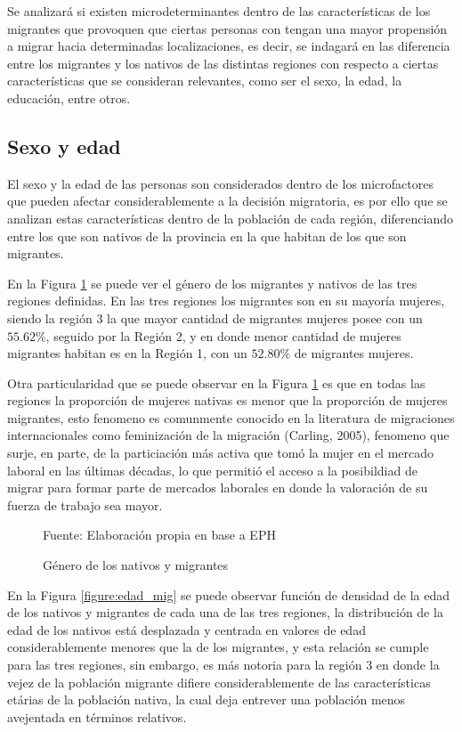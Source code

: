 \documentclass[12pt,a4paper]{article}
\newcommand{\source}[1]{\caption*{\scriptsize{Fuente: {#1}}} }
\begin{document}
Se analizará si existen microdeterminantes dentro de las características de los migrantes que provoquen que ciertas personas con tengan una mayor propensión a migrar hacia determinadas localizaciones, es decir, se indagará en las diferencia entre los migrantes y los nativos de las distintas regiones con respecto a ciertas características que se consideran relevantes, como ser el sexo, la edad, la educación, entre otros. 


\subsection{Sexo y edad}
El sexo y la edad de las personas son considerados dentro de los microfactores que pueden afectar considerablemente a la decisión migratoria, es por ello que se analizan estas características dentro de la población de cada región, diferenciando entre los que son nativos de la provincia en la que habitan de los que son migrantes.

En la Figura \ref{figure:sexo_mig_} se puede ver el género de los migrantes y nativos de las tres regiones definidas. En las tres regiones los migrantes  son en su mayoría mujeres, siendo la región 3 la que mayor cantidad de migrantes mujeres posee con un $55.62\%$, seguido por la Región 2, y en donde menor cantidad de mujeres migrantes habitan es en la Región 1, con un $52.80\%$ de migrantes mujeres.

Otra particularidad que se puede observar en la Figura \ref{figure:sexo_mig_} es que en todas las regiones la proporción de mujeres nativas es menor que la proporción de mujeres migrantes, esto fenomeno es comunmente conocido en la literatura de migraciones internacionales como feminización de la migración (Carling, 2005), fenomeno que surje, en parte, de la particiación más activa que tomó la mujer en el mercado laboral en las últimas décadas, lo que permitió el acceso a la posibildiad de migrar para formar parte de mercados laborales en donde la valoración de su fuerza de trabajo sea mayor.

\begin{figure}[ht!]
\begin{center}
 
 	\caption{Género de los nativos y migrantes}
 	\label{figure:sexo_mig_}
	\source{Elaboración propia en base a EPH}
\end{center}

\end{figure}

\newpage
En la Figura \ref{figure:edad_mig} se puede observar función de densidad de la edad de los nativos y migrantes de cada una de las tres regiones, la distribución de la edad de los nativos  está desplazada y centrada en valores de edad considerablemente menores que la de los migrantes, y esta relación se cumple para las tres regiones, sin embargo, es más notoria para la región 3 en donde la vejez de la población migrante difiere considerablemente de las características etárias de la población nativa, la cual deja entrever una población menos avejentada en términos relativos.
\end{document}
